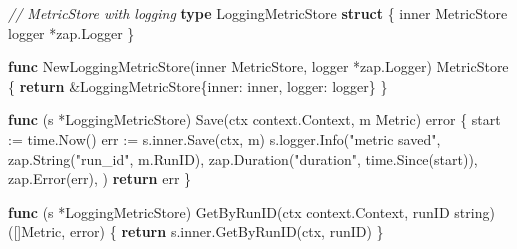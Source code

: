 \documentclass[
]{article}
\newenvironment{Shaded}{}{}
\newcommand{\CommentTok}[1]{\textcolor[rgb]{0.38,0.63,0.69}{\textit{#1}}}
\newcommand{\ControlFlowTok}[1]{\textcolor[rgb]{0.00,0.44,0.13}{\textbf{#1}}}
\newcommand{\DataTypeTok}[1]{\textcolor[rgb]{0.56,0.13,0.00}{#1}}
\newcommand{\KeywordTok}[1]{\textcolor[rgb]{0.00,0.44,0.13}{\textbf{#1}}}
\newcommand{\NormalTok}[1]{#1}
\newcommand{\OperatorTok}[1]{\textcolor[rgb]{0.40,0.40,0.40}{#1}}
\newcommand{\StringTok}[1]{\textcolor[rgb]{0.25,0.44,0.63}{#1}}
\begin{document}
\begin{Shaded}
\begin{Highlighting}[]
\CommentTok{// MetricStore with logging}
\KeywordTok{type}\NormalTok{ LoggingMetricStore }\KeywordTok{struct} \OperatorTok{\{}
\NormalTok{    inner  MetricStore}
\NormalTok{    logger }\OperatorTok{*}\NormalTok{zap}\OperatorTok{.}\NormalTok{Logger}
\OperatorTok{\}}

\KeywordTok{func}\NormalTok{ NewLoggingMetricStore}\OperatorTok{(}\NormalTok{inner MetricStore}\OperatorTok{,}\NormalTok{ logger }\OperatorTok{*}\NormalTok{zap}\OperatorTok{.}\NormalTok{Logger}\OperatorTok{)}\NormalTok{ MetricStore }\OperatorTok{\{}
    \ControlFlowTok{return} \OperatorTok{\&}\NormalTok{LoggingMetricStore}\OperatorTok{\{}\NormalTok{inner}\OperatorTok{:}\NormalTok{ inner}\OperatorTok{,}\NormalTok{ logger}\OperatorTok{:}\NormalTok{ logger}\OperatorTok{\}}
\OperatorTok{\}}

\KeywordTok{func} \OperatorTok{(}\NormalTok{s }\OperatorTok{*}\NormalTok{LoggingMetricStore}\OperatorTok{)}\NormalTok{ Save}\OperatorTok{(}\NormalTok{ctx context}\OperatorTok{.}\NormalTok{Context}\OperatorTok{,}\NormalTok{ m Metric}\OperatorTok{)} \DataTypeTok{error} \OperatorTok{\{}
\NormalTok{    start }\OperatorTok{:=}\NormalTok{ time}\OperatorTok{.}\NormalTok{Now}\OperatorTok{()}
\NormalTok{    err }\OperatorTok{:=}\NormalTok{ s}\OperatorTok{.}\NormalTok{inner}\OperatorTok{.}\NormalTok{Save}\OperatorTok{(}\NormalTok{ctx}\OperatorTok{,}\NormalTok{ m}\OperatorTok{)}
\NormalTok{    s}\OperatorTok{.}\NormalTok{logger}\OperatorTok{.}\NormalTok{Info}\OperatorTok{(}\StringTok{"metric saved"}\OperatorTok{,}
\NormalTok{        zap}\OperatorTok{.}\NormalTok{String}\OperatorTok{(}\StringTok{"run\_id"}\OperatorTok{,}\NormalTok{ m}\OperatorTok{.}\NormalTok{RunID}\OperatorTok{),}
\NormalTok{        zap}\OperatorTok{.}\NormalTok{Duration}\OperatorTok{(}\StringTok{"duration"}\OperatorTok{,}\NormalTok{ time}\OperatorTok{.}\NormalTok{Since}\OperatorTok{(}\NormalTok{start}\OperatorTok{)),}
\NormalTok{        zap}\OperatorTok{.}\NormalTok{Error}\OperatorTok{(}\NormalTok{err}\OperatorTok{),}
    \OperatorTok{)}
    \ControlFlowTok{return}\NormalTok{ err}
\OperatorTok{\}}

\KeywordTok{func} \OperatorTok{(}\NormalTok{s }\OperatorTok{*}\NormalTok{LoggingMetricStore}\OperatorTok{)}\NormalTok{ GetByRunID}\OperatorTok{(}\NormalTok{ctx context}\OperatorTok{.}\NormalTok{Context}\OperatorTok{,}\NormalTok{ runID }\DataTypeTok{string}\OperatorTok{)} \OperatorTok{([]}\NormalTok{Metric}\OperatorTok{,} \DataTypeTok{error}\OperatorTok{)} \OperatorTok{\{}
    \ControlFlowTok{return}\NormalTok{ s}\OperatorTok{.}\NormalTok{inner}\OperatorTok{.}\NormalTok{GetByRunID}\OperatorTok{(}\NormalTok{ctx}\OperatorTok{,}\NormalTok{ runID}\OperatorTok{)}
\OperatorTok{\}}
\end{Highlighting}
\end{Shaded}
\end{document}
